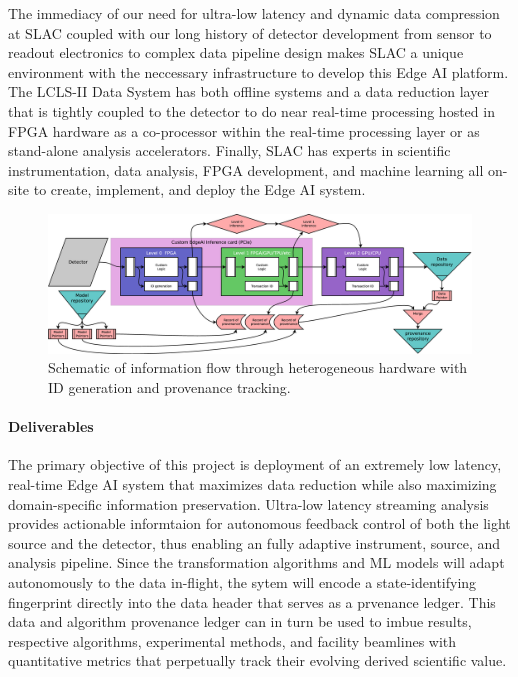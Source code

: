 \documentclass{article}
\begin{document}
The immediacy of our need for ultra-low latency and dynamic data compression at SLAC coupled with our long history of detector development from sensor to readout electronics to complex data pipeline design makes SLAC a unique environment with the neccessary infrastructure to develop this Edge AI platform.
The LCLS-II Data System has both offline systems and a data reduction layer that is tightly coupled to the detector to do near real-time processing hosted in FPGA hardware as a co-processor within the real-time processing layer or as stand-alone analysis accelerators. 
Finally, SLAC has experts in scientific instrumentation, data analysis, FPGA development, and machine learning all on-site to create, implement, and deploy the Edge AI system.

\begin{figure}
	\vspace{-1\baselineskip}
	\centerline{\includegraphics[clip,width=.75\linewidth]{./figs/EdgeFlow.eps}}
	\vspace{-1\baselineskip}
	\caption{
		\label{fig::EdgeFlow}
		Schematic of information flow through heterogeneous hardware with ID generation and provenance tracking.
		}
	\vspace{-1\baselineskip}
\end{figure}

\paragraph{Deliverables}%
The primary objective of this project is deployment of an extremely low latency, real-time Edge AI system that maximizes data reduction while also maximizing domain-specific information preservation. 
Ultra-low latency streaming analysis provides actionable informtaion for autonomous feedback control of both the light source and the detector, thus enabling an fully adaptive instrument, source, and analysis pipeline.
Since the transformation algorithms and ML models will adapt autonomously to the data in-flight, the sytem will encode a state-identifying fingerprint directly into the data header that serves as a prvenance ledger.
This data and algorithm provenance ledger can in turn be used to imbue results, respective algorithms, experimental methods, and facility beamlines with quantitative metrics that perpetually track their evolving derived scientific value.
\end{document}
